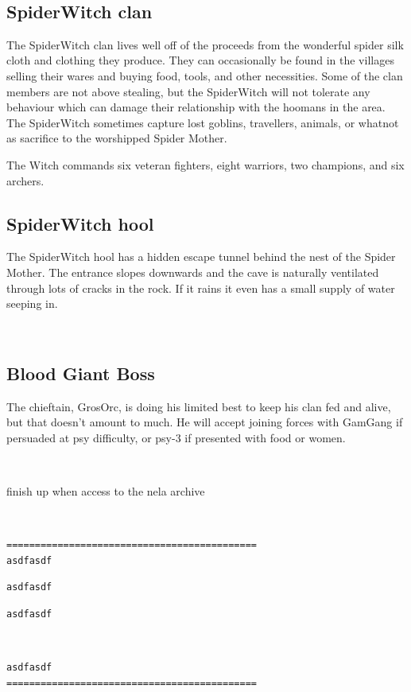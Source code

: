 \


\subsection*{SpiderWitch clan}

The SpiderWitch clan lives well off of the proceeds from the wonderful spider silk cloth and clothing they produce. They can occasionally be found in the villages selling their wares and buying food, tools, and other necessities. Some of the clan members are not above stealing, but the SpiderWitch will not tolerate any behaviour which can damage their relationship with the hoomans in the area. The SpiderWitch sometimes capture lost goblins, travellers, animals, or whatnot as sacrifice to the worshipped Spider Mother.

The Witch commands six veteran fighters, eight warriors, two champions, and six archers.


\subsection*{SpiderWitch hool}

The SpiderWitch hool has a hidden escape tunnel behind the nest of the Spider Mother. The entrance slopes downwards and the cave is naturally ventilated through lots of cracks in the rock. If it rains it even has a small supply of water seeping in. 

\


\goodbreak
\subsection*{Blood Giant Boss}

The chieftain, GrosOrc, is doing his limited best to keep his clan fed and alive, but that doesn't amount to much. He will accept joining forces with GamGang if persuaded at psy difficulty, or psy-3 if presented with food or women.

\

\todo finish up when access to the nela archive

\

\small \begin{samepage} \begin{verbatim}
============================================
asdfasdf
\end{verbatim} \end{samepage} \begin{samepage} \begin{verbatim}
asdfasdf
\end{verbatim} \goodbreak \begin{verbatim}
asdfasdf
\end{verbatim} \end{samepage}   \   \goodbreak \begin{samepage} \begin{verbatim}
asdfasdf
============================================
\end{verbatim} \end{samepage} \normalsize





